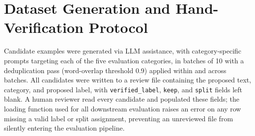 \documentclass[11pt]{article}
\begin{document}


\appendix

\section{Dataset Generation and Hand-Verification Protocol}
\label{sec:appendix-gen}

Candidate examples were generated via LLM assistance, with category-specific
prompts targeting each of the five evaluation categories, in batches of 10
with a deduplication pass (word-overlap threshold 0.9) applied within and
across batches. All candidates were written to a review file containing the
proposed text, category, and proposed label, with \texttt{verified\_label},
\texttt{keep}, and \texttt{split} fields left blank. A human reviewer read
every candidate and populated these fields; the loading function used for
all downstream evaluation raises an error on any row missing a valid label
or split assignment, preventing an unreviewed file from silently entering
the evaluation pipeline.
\end{document}
